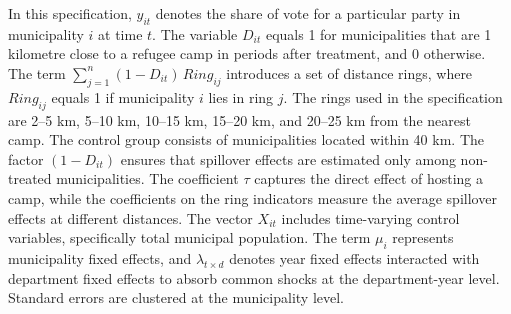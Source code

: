 In this specification, $y_{it}$ denotes the share of vote for a particular party in municipality $i$ at time $t$. The variable $D_{it}$ equals 1 for municipalities that are 1 kilometre close to a refugee camp in periods after treatment, and 0 otherwise. The term $\sum_{j=1}^{n} (1 - D_{it})\, Ring_{ij}$ introduces a set of distance rings, where $Ring_{ij}$ equals 1 if municipality $i$ lies in ring $j$. The rings used in the specification are 2--5 km, 5--10 km, 10--15 km, 15--20 km, and 20--25 km from the nearest camp. The control group consists of municipalities located within 40 km. The factor $(1 - D_{it})$ ensures that spillover effects are estimated only among non-treated municipalities. The coefficient $\tau$ captures the direct effect of hosting a camp, while the coefficients on the ring indicators measure the average spillover effects at different distances. The vector $X_{it}$ includes time-varying control variables, specifically total municipal population. The term $\mu_i$ represents municipality fixed effects, and $\lambda_{t \times d}$ denotes year fixed effects interacted with department fixed effects to absorb common shocks at the department-year level. Standard errors are clustered at the municipality level. 











